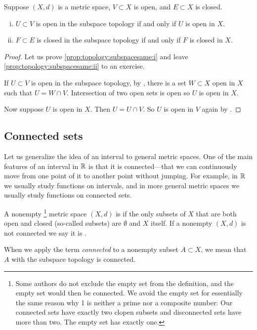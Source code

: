 \begin{prop} \label{prop:topology:subspacesame}
Suppose $(X,d)$ is a metric space, $V \subset X$ is open,
and $E \subset X$ is closed.
\begin{enumerate}[(i)]
\item \label{prop:topology:subspacesame:i}
$U \subset V$ is open in the subspace topology if and only if $U$ is open
in $X$.
\item \label{prop:topology:subspacesame:ii}
$F \subset E$ is closed in the subspace topology if and only if $F$ is
closed in $X$.
\end{enumerate}
\end{prop}

\begin{proof}
Let us prove
\ref{prop:topology:subspacesame:i}
and leave 
\ref{prop:topology:subspacesame:ii} to an exercise.

If $U \subset V$ is open in the subspace topology, by
, there is a set $W \subset X$
open in $X$ such that $U = W \cap V$.  Intersection of two open sets
is open so $U$ is open in $X$.

Now suppose $U$ is open in $X$.  Then $U = U \cap V$. So
$U$ is open in $V$ again by .
\end{proof}

\subsection{Connected sets}

Let us generalize the idea of an interval to general metric spaces.  One of
the main features of an interval in ${\mathbb{R}}$ is that it is
connected---that we can continuously move from one point of it to
another point without jumping.
For example, in ${\mathbb{R}}$ we usually study functions on intervals,
and in more general metric spaces we usually study functions on connected sets.

\begin{defn}
A nonempty%
\footnote{Some authors do not exclude the empty set from the definition,
and the empty set would then be connected.
We avoid the empty set for essentially the same reason why
1 is neither a prime nor a composite number:  Our connected sets have exactly
two clopen subsets and disconnected sets have more than two.  The empty set
has exactly one.}
metric space $(X,d)$ is \emph{} if the
only subsets of $X$ that are both open and closed (so-called
\emph{} subsets) are $\emptyset$ and $X$ itself.
If a nonempty $(X,d)$ is not connected we say it is
\emph{}.

When we apply the term \emph{connected} to a nonempty subset $A \subset X$, we 
mean that $A$ with the subspace topology is connected.
\end{defn}

